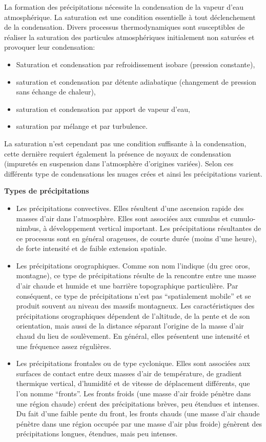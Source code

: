 \documentclass[a4paper,11pt]{article}
\numberwithin{equation}{section}
\begin{document}
La formation des précipitations nécessite la condensation de la vapeur d'eau atmosphérique. La saturation est une condition essentielle à tout déclenchement de la condensation. Divers processus thermodynamiques sont susceptibles de réaliser la saturation des particules atmosphériques initialement non saturées et provoquer leur condensation:

\begin{itemize}
	\item Saturation et condensation par refroidissement isobare (pression constante),
	\item saturation et condensation par détente adiabatique (changement de pression sans échange de chaleur),
	\item saturation et condensation par apport de vapeur d'eau,
	\item saturation par mélange et par turbulence.
\end{itemize}
La saturation n'est cependant pas une condition suffisante à la condensation, cette dernière requiert également la présence de noyaux de condensation (impuretés en suspension dans l'atmosphère d'origines variées). Selon ces différents type de condensations les nuages crées et ainsi les précipitations varient.

\vspace{0.7cm}

\noindent \textbf{Types de précipitations}

\begin{itemize}
	\item Les précipitations convectives. Elles résultent d'une ascension rapide des masses d'air dans l'atmosphère. Elles sont associées aux cumulus et cumulo-nimbus, à développement vertical important. Les précipitations résultantes de ce processus sont en général orageuses, de courte durée (moins d'une heure), de forte intensité et de faible extension spatiale.
	\item Les précipitations orographiques. Comme son nom l'indique (du grec oros, montagne), ce type de précipitations résulte de la rencontre entre une masse d'air chaude et humide et une barrière topographique particulière. Par conséquent, ce type de précipitations n’est pas ``spatialement mobile'' et se produit souvent au niveau des massifs montagneux. Les caractéristiques des précipitations orographiques dépendent de l'altitude, de la pente et de son orientation, mais aussi de la distance séparant l'origine de la masse d'air chaud du lieu de soulèvement. En général, elles présentent une intensité et une fréquence assez régulières.
	\item Les précipitations frontales ou de type cyclonique. Elles sont associées aux surfaces de contact entre deux masses d'air de température, de gradient thermique vertical, d'humidité et de vitesse de déplacement différents, que l'on nomme ``fronts''. Les fronts froids (une masse d’air froide pénètre dans une région chaude) créent des précipitations brèves, peu étendues et intenses. Du fait d’une faible pente du front, les fronts chauds (une masse d’air chaude pénètre dans une région occupée par une masse d’air plus froide) génèrent des précipitations longues, étendues, mais peu intenses.
\end{itemize}
\end{document}
